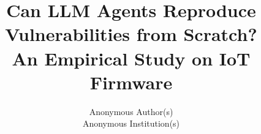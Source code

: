 \documentclass[letterpaper,twocolumn,10pt]{article}
\begin{document}
\date{}
\title{\Large\bf Can LLM Agents Reproduce Vulnerabilities from Scratch?\\An Empirical Study on IoT Firmware}
\author{{\rm Anonymous Author(s)}\\Anonymous Institution(s)}
\maketitle








\label{main-text-end}
\clearpage


\clearpage
\appendix

\clearpage

\clearpage


\clearpage

\end{document}
